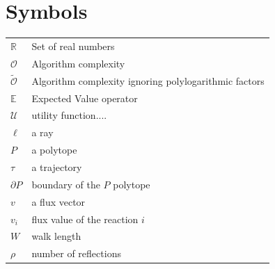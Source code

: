 \documentclass[master=elt, cleveref, autoref, masteroption=eg]{kulemt}
\def\RR{{\mathbb R}}
\newcommand{\OO}{\mathcal{O}\xspace}
\newcommand{\sO}{\widetilde{\mathcal{O}}\xspace}
\begin{document}
\section*{Symbols}
   \begin{flushleft}
   \renewcommand{\arraystretch}{1.1}
   \begin{tabularx}{\textwidth}{@{}p{12mm}X@{}}
      $\RR$          & Set of real numbers\\
      $\OO$          & Algorithm complexity\\
      $\sO$          & Algorithm complexity ignoring polylogarithmic factors\\
      $\mathbb{E}$   & Expected Value operator\\
      $\mathcal{U}$  & utility function....\\
      $\ell$         & a ray\\
      $P$            & a polytope\\
      $\tau$         & a trajectory\\
      $\partial P$   & boundary of the $P$ polytope\\
      $v$            & a flux vector\\
      $v_i$          & flux value of the reaction $i$\\
      $W$            & walk length\\
      $\rho$         & number of reflections\\
   \end{tabularx}
\end{flushleft}


\mainmatter

% 

% 

% 

% 

% 

% 



% 

% 
% 

\backmatter 


% 






\end{document}
